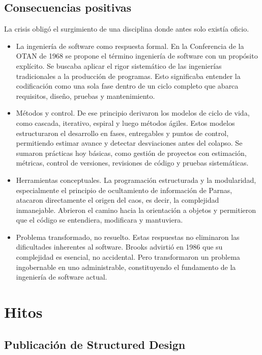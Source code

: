\documentclass{./plantilla/umss}
\begin{document}
\subsection{Consecuencias positivas}

La crisis obligó el surgimiento de una disciplina donde antes solo existía oficio.

\begin{itemize}
    \item La ingeniería de software como respuesta formal. En la Conferencia de la OTAN de 1968 se propone el término ingeniería de software con un propósito explícito. Se buscaba aplicar el rigor sistemático de las ingenierías tradicionales a la producción de programas. Esto significaba entender la codificación como una sola fase dentro de un ciclo completo que abarca requisitos, diseño, pruebas y mantenimiento.
    \item Métodos y control. De ese principio derivaron los modelos de ciclo de vida, como cascada, iterativo, espiral y luego métodos ágiles. Estos modelos estructuraron el desarrollo en fases, entregables y puntos de control, permitiendo estimar avance y detectar desviaciones antes del colapso. Se sumaron prácticas hoy básicas, como gestión de proyectos con estimación, métricas, control de versiones, revisiones de código y pruebas sistemáticas.
    \item Herramientas conceptuales. La programación estructurada y la modularidad, especialmente el principio de ocultamiento de información de Parnas, atacaron directamente el origen del caos, es decir, la complejidad inmanejable. Abrieron el camino hacia la orientación a objetos y permitieron que el código se entendiera, modificara y mantuviera.
    \item Problema transformado, no resuelto. Estas respuestas no eliminaron las dificultades inherentes al software. Brooks advirtió en 1986 que su complejidad es esencial, no accidental. Pero transformaron un problema ingobernable en uno administrable, constituyendo el fundamento de la ingeniería de software actual.
\end{itemize}

\section{Hitos}

\subsection{Publicación de Structured Design}
\end{document}
